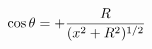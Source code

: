 \documentclass[preview]{standalone}
\begin{document}
\begin{align*}
\cos \theta  = +  {R  \over (x^2 + R^2)^{1/2}}
\end{align*}
\end{document}
